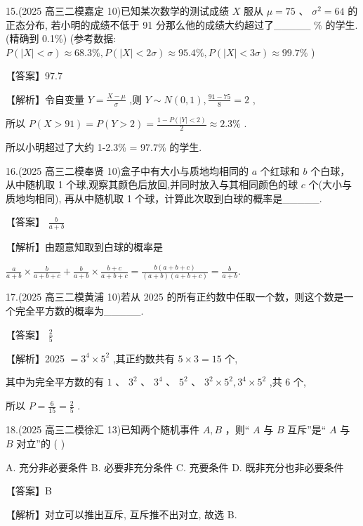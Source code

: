 \documentclass[10pt]{article}
\begin{document}
15.(2025 高三二模嘉定 10)已知某次数学的测试成绩 \(X\) 服从 \(\mu  = {75}\text{ 、 }{\sigma }^{2} = {64}\) 的正态分布, 若小明的成绩不低于 91 分那么他的成绩大约超过了\_\_\_\_\_ \(\%\) 的学生. (精确到 0.1\%) (参考数据: \(P\left( {\left| X\right|  < \sigma }\right)  \approx  {68.3}\% ,P\left( {\left| X\right|  < {2\sigma }}\right)  \approx  {95.4}\% ,P\left( {\left| X\right|  < {3\sigma }}\right)  \approx  {99.7}\%\) )

【答案】97.7

【解析】令自变量 \(Y = \frac{X - \mu }{\sigma }\) ,则 \(Y \sim  N\left( {0,1}\right) ,\frac{{91} - {75}}{8} = 2\) ,

所以 \(P\left( {X > {91}}\right)  = P\left( {Y > 2}\right)  = \frac{1 - P\left( {\left| Y\right|  < 2}\right) }{2} \approx  {2.3}\%\) .

所以小明超过了大约 1-2.3\% = 97.7\% 的学生.

16.(2025 高三二模奉贤 10)盒子中有大小与质地均相同的 \(a\) 个红球和 \(b\) 个白球，从中随机取 1 个球,观察其颜色后放回,并同时放入与其相同颜色的球 \(c\) 个(大小与质地均相同), 再从中随机取 1 个球，计算此次取到白球的概率是\_\_\_\_\_.

【答案】 \(\frac{b}{a + b}\)

【解析】由题意知取到白球的概率是

\(\frac{a}{a + b} \times  \frac{b}{a + b + c} + \frac{b}{a + b} \times  \frac{b + c}{a + b + c} = \frac{b\left( {a + b + c}\right) }{\left( {a + b}\right) \left( {a + b + c}\right) } = \frac{b}{a + b}.\)

17.(2025 高三二模黄浦 10)若从 2025 的所有正约数中任取一个数，则这个数是一个完全平方数的概率为\_\_\_\_\_.

【答案】 \(\frac{2}{5}\)

【解析】2025 \(= {3}^{4} \times  {5}^{2}\) ,其正约数共有 \(5 \times  3 = {15}\) 个,

其中为完全平方数的有 \(1\text{ 、 }{3}^{2}\text{ 、 }{3}^{4}\text{ 、 }{5}^{2}\text{ 、 }{3}^{2} \times  {5}^{2},{3}^{4} \times  {5}^{2}\) ,共 6 个,

所以 \(P = \frac{6}{15} = \frac{2}{5}\) .

18.(2025 高三二模徐汇 13)已知两个随机事件 \(A,B\) ，则“ \(A\) 与 \(B\) 互斥”是“ \(A\) 与 \(B\) 对立”的 ( )

A. 充分非必要条件 B. 必要非充分条件 C. 充要条件 D. 既非充分也非必要条件

【答案】B

【解析】对立可以推出互斥, 互斥推不出对立, 故选 B.
\end{document}
